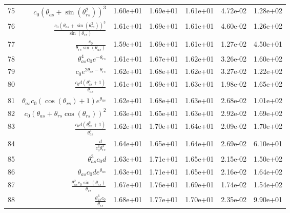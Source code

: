 \begin{tabularx}{\textwidth}{lRRRRRl}
75  &  $ c_{0} \left(\theta_{as} + \sin{\left(\theta_{rs}^{2} \right)}\right)^{3} $  &  1.60e+01  &  1.69e+01  &  1.61e+01  &  4.72e-02  &  1.28e+02  \\ 
76  &  $ \displaystyle\frac{c_{0} \left(\theta_{as} + \sin{\left(\theta_{rs}^{2} \right)}\right)^{3}}{\sin{\left(\theta_{rs} \right)}} $  &  1.61e+01  &  1.69e+01  &  1.61e+01  &  4.60e-02  &  1.26e+02  \\ 
77  &  $ \displaystyle\frac{c_{0}}{\theta_{rs} \sin{\left(\theta_{as} \right)}} $  &  1.59e+01  &  1.69e+01  &  1.61e+01  &  1.27e-02  &  4.50e+01  \\ 
78  &  $ \theta_{as}^{4} c_{0} e^{- \theta_{rs}} $  &  1.61e+01  &  1.67e+01  &  1.62e+01  &  3.26e-02  &  1.60e+02  \\ 
79  &  $ c_{0} e^{2 \theta_{as} - \theta_{rs}} $  &  1.62e+01  &  1.68e+01  &  1.62e+01  &  3.27e-02  &  1.22e+02  \\ 
80  &  $ \displaystyle\frac{c_{0} d \left(\theta_{as}^{4} + 1\right)}{\theta_{as}} $  &  1.61e+01  &  1.69e+01  &  1.63e+01  &  1.98e-02  &  1.65e+02  \\ 
81  &  $ \theta_{as} c_{0} \left(\cos{\left(\theta_{rs} \right)} + 1\right) e^{\theta_{as}} $  &  1.62e+01  &  1.68e+01  &  1.63e+01  &  2.68e-02  &  1.01e+02  \\ 
82  &  $ c_{0} \left(\theta_{as} + \theta_{rs} \cos{\left(\theta_{rs} \right)}\right)^{2} $  &  1.63e+01  &  1.65e+01  &  1.63e+01  &  2.92e-02  &  1.69e+02  \\ 
83  &  $ \displaystyle\frac{c_{0} d \left(\theta_{as}^{6} + 1\right)}{\theta_{as}^{3}} $  &  1.62e+01  &  1.70e+01  &  1.64e+01  &  2.09e-02  &  1.70e+02  \\ 
84  &  $ \displaystyle\frac{d}{c_{0}^{6} \theta_{rs}^{3}} $  &  1.64e+01  &  1.65e+01  &  1.64e+01  &  2.69e-02  &  6.10e+01  \\ 
85  &  $ \theta_{as}^{3} c_{0} d $  &  1.63e+01  &  1.71e+01  &  1.65e+01  &  2.15e-02  &  1.50e+02  \\ 
86  &  $ \theta_{as} c_{0} d e^{\theta_{as}} $  &  1.63e+01  &  1.71e+01  &  1.65e+01  &  2.16e-02  &  1.64e+02  \\ 
87  &  $ \displaystyle\frac{\theta_{as}^{2} c_{0} \sin{\left(\theta_{rs} \right)}}{\theta_{rs}} $  &  1.67e+01  &  1.76e+01  &  1.69e+01  &  1.74e-02  &  1.54e+02  \\ 
88  &  $ \displaystyle\frac{\theta_{as}^{3} c_{0}}{\theta_{rs}} $  &  1.68e+01  &  1.77e+01  &  1.70e+01  &  2.35e-02  &  9.90e+01  \\ 

\end{tabularx}
